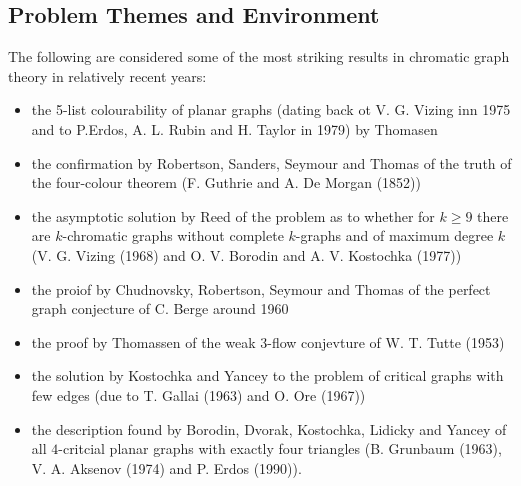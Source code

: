 \documentclass[12pt, a4paper]{article}
\begin{document}
\subsection*{Problem Themes and Environment}
\hspace{\parindent}The following are considered some of the most striking results in chromatic graph theory in relatively recent years:
\begin{itemize}
\renewcommand\labelitemi{\tiny$\bullet$}
\item the 5-list colourability of planar graphs (dating back ot V. G. Vizing inn 1975 and to P.Erdos, A. L. Rubin and H. Taylor in 1979) by Thomasen
\item the confirmation by Robertson, Sanders, Seymour and Thomas of the truth of the four-colour theorem (F. Guthrie and A. De Morgan (1852))
\item the asymptotic solution by Reed of the problem as to whether for $k \geq 9$ there are $k$-chromatic graphs without complete $k$-graphs and of maximum degree $k$ (V. G. Vizing (1968) and O. V. Borodin and A. V. Kostochka (1977))
\item the proiof by Chudnovsky, Robertson, Seymour and Thomas of the perfect graph conjecture of C. Berge around 1960
\item the proof by Thomassen of the weak $3$-flow conjevture of W. T. Tutte (1953)
\item the solution by Kostochka and Yancey to the problem of critical graphs with few edges (due to T. Gallai (1963) and O. Ore (1967))
\item the description found by Borodin, Dvorak, Kostochka, Lidicky and Yancey of all $4$-critcial planar graphs with exactly four triangles (B. Grunbaum (1963), V. A. Aksenov (1974) and P. Erdos (1990)).
\end{itemize}                                                                                                                                                              
\end{document}

